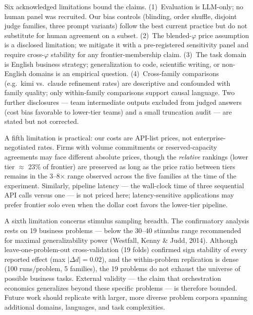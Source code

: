 \documentclass[12pt,a4paper]{article}
\newcommand{\phiBlend}{\varphi}
\begin{document}
Six acknowledged limitations bound the claims. (1)~Evaluation is LLM-only; no
human panel was recruited. Our bias controls (blinding, order shuffle, disjoint
judge families, three prompt variants) follow the best current practice
\citep{ZhengEtAl2023, VergaEtAl2024} but do not substitute for human agreement
on a subset. (2)~The blended-$\phiBlend$ price assumption is a disclosed
limitation; we mitigate it with a pre-registered sensitivity panel and require
cross-$\phiBlend$ stability for any frontier-membership claim. (3)~The task
domain is English business strategy; generalization to code, scientific writing,
or non-English domains is an empirical question. (4)~Cross-family comparisons
(e.g.\ kimi vs.\ claude refinement rates) are descriptive and confounded with
family quality; only within-family comparisons support causal language. Two
further disclosures --- team intermediate outputs excluded from judged answers
(cost bias favorable to lower-tier teams) and a small truncation audit --- are stated
but not corrected.

A fifth limitation is practical: our costs are API-list prices, not
enterprise-negotiated rates. Firms with volume commitments or reserved-capacity
agreements may face different absolute prices, though the \emph{relative}
rankings (lower tier $\approx$ 23\% of frontier) are preserved as long as the
price ratio between tiers remains in the 3--8$\times$ range observed across the
five families at the time of the experiment. Similarly, pipeline latency --- the
wall-clock time of three sequential API calls versus one --- is not priced here;
latency-sensitive applications may prefer frontier solo even when the dollar
cost favors the lower-tier pipeline.

A sixth limitation concerns stimulus sampling breadth. The confirmatory
analysis rests on 19 business problems --- below the 30--40 stimulus range
recommended for maximal generalizability power (Westfall, Kenny \& Judd,
2014). Although leave-one-problem-out cross-validation (19 folds)
confirmed sign stability of every reported effect (max $|\Delta d| = 0.02$),
and the within-problem replication is dense (100 runs/problem, 5
families), the 19 problems do not exhaust the universe of possible
business tasks. External validity --- the claim that orchestration
economics generalizes beyond these specific problems --- is therefore
bounded. Future work should replicate with larger, more diverse problem
corpora spanning additional domains, languages, and task complexities.

\end{document}

